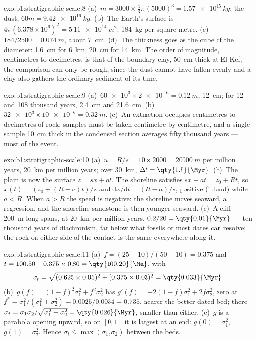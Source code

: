 \begin{solution}{exo:b1:stratigraphic-scale:8}
(a)~$m = 3000 \times \frac43\pi\,(5000)^3 = \qty{1.57e15}{kg}$; the dust,
$60m = \qty{9.42e16}{kg}$. (b)~The Earth's surface is $4\pi(6.378\times10^6)^2
= \qty{5.11e14}{m^2}$: \qty{184}{kg} per square metre. (c)~$184/2500 =
\qty{0.074}{m}$, about \qty{7}{cm}. (d)~The thickness goes as the cube of the
diameter: \qty{1.6}{cm} for \qty{6}{km}, \qty{20}{cm} for \qty{14}{km}. The order
of magnitude, centimetres to decimetres, is that of the boundary clay,
\qty{50}{cm} thick at El Kef; the comparison can only be rough, since the dust
cannot have fallen evenly and a clay also gathers the ordinary sediment of its
time.
\end{solution}

\begin{solution}{exo:b1:stratigraphic-scale:9}
(a)~$\num{60e3} \times \num{2e-6} = \qty{0.12}{m}$, \qty{12}{cm}; for 12 and 108
thousand years, \qty{2.4}{cm} and \qty{21.6}{cm}. (b)~$\num{32e3} \times
\num{10e-6} = \qty{0.32}{m}$. (c)~An extinction occupies centimetres to decimetres
of rock: samples must be taken centimetre by centimetre, and a single sample
\qty{10}{cm} thick in the condensed section averages fifty thousand years ---
most of the event.
\end{solution}

\begin{solution}{exo:b1:stratigraphic-scale:10}
(a)~$u = R/s = 10 \times 2000 = \qty{20000}{m}$ per million years,
\qty{20}{km} per million years; over \qty{30}{km}, $\Delta t = \qty{1.5}{\Myr}$.
(b)~The plain is now the surface $z = s x + a t$. The shoreline satisfies
$s x + a t = z_0 + R t$, so $x(t) = (z_0 + (R - a)t)/s$ and
$\mathrm dx/\mathrm dt = (R - a)/s$, positive (inland) while $a < R$. When
$a > R$ the speed is negative: the shoreline moves seaward, a regression, and
the shoreline sandstone is then younger seaward. (c)~A cliff \qty{200}{m} long spans,
at \qty{20}{km} per million years, $0.2/20 = \qty{0.01}{\Myr}$ --- ten thousand
years of diachronism, far below what fossils or most dates can resolve; the rock on
either side of the contact is the same everywhere along it.
\end{solution}

\begin{solution}{exo:b1:stratigraphic-scale:11}
(a)~$f = (25 - 10)/(50 - 10) = 0.375$ and $t = 100.50 - 0.375 \times 0.80 =
\qty{100.20}{\Ma}$, with
\[
  \sigma_t = \sqrt{(0.625 \times 0.05)^2 + (0.375 \times 0.03)^2} = \qty{0.033}{\Myr}.
\] (b)~$g(f) = (1 - f)^2\sigma_1^2 + f^2\sigma_2^2$
has $g'(f) = -2(1 - f)\sigma_1^2 + 2f\sigma_2^2$, zero at $f^* =
\sigma_1^2/(\sigma_1^2 + \sigma_2^2) = 0.0025/0.0034 = 0.735$, nearer the better
dated bed; there $\sigma_t = \sigma_1\sigma_2/\sqrt{\sigma_1^2 + \sigma_2^2} =
\qty{0.026}{\Myr}$, smaller than either. (c)~$g$ is a parabola opening upward, so
on $[0, 1]$ it is largest at an end: $g(0) = \sigma_1^2$, $g(1) = \sigma_2^2$.
Hence $\sigma_t \le \max(\sigma_1, \sigma_2)$ between the beds.
\end{solution}

